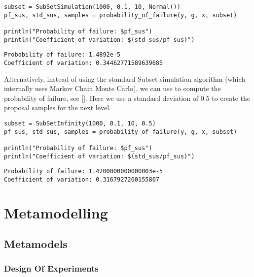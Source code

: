 \begin{verbatim}
subset = SubSetSimulation(1000, 0.1, 10, Normal())
pf_sus, std_sus, samples = probability_of_failure(y, g, x, subset)

println("Probability of failure: $pf_sus")
println("Coefficient of variation: $(std_sus/pf_sus)")
\end{verbatim}


\begin{verbatim}
Probability of failure: 1.4892e-5
Coefficient of variation: 0.34462771589639685
\end{verbatim}



Alternatively, instead of using the standard Subset simulation algorithm (which internally uses Markov Chain Monte Carlo), we can use  to compute the probability of failure, see []. Here we use a standard deviation of \(0.5\) to create the proposal samples for the next level.




\begin{verbatim}
subset = SubSetInfinity(1000, 0.1, 10, 0.5)
pf_sus, std_sus, samples = probability_of_failure(y, g, x, subset)

println("Probability of failure: $pf_sus")
println("Coefficient of variation: $(std_sus/pf_sus)")
\end{verbatim}


\begin{verbatim}
Probability of failure: 1.4200000000000003e-5
Coefficient of variation: 0.3167927200155807
\end{verbatim}



\chapter{Metamodelling}


\section{Metamodels}



\label{13382004127081062345}{}


\subsection{Design Of Experiments}



